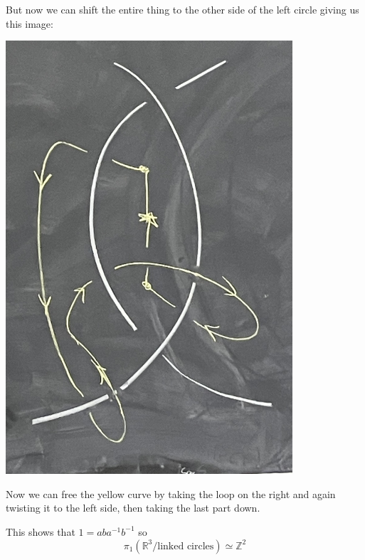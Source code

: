 \documentclass[12pt]{article}
\newcommand{\R}{\mathbb{R}}
\newcommand{\Z}{\mathbb{Z}}
\begin{document}
    But now we can shift the entire thing to the other side of the left circle giving us this image:
    \begin{center}
        \includegraphics[width=0.8\textwidth]{Images/April 24 - Word 2.png}
    \end{center}

    Now we can free the yellow curve by taking the loop on the right and again twisting it to the left side, then taking the last part down. 
    
    This shows that $1 = aba^{-1}b^{-1}$ so 
    \[\pi_1(\R^3/\text{linked circles}) \simeq \Z^2\]
\end{document}
